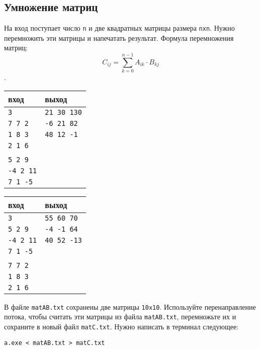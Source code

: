 \documentclass{article}
\begin{document}
\subsection{Умножение матриц}
На вход поступает число \texttt{n} и две квадратных матрицы размера \texttt{nxn}. Нужно перемножить эти матрицы и напечатать результат. Формула перемножения матриц:
$$
C_{ij} = \sum\limits_{k=0}^{n-1} A_{ik} \cdot B_{kj}
$$.
\begin{multicols}{2}
\begin{center}
\begin{tabular}{ l | l }
 вход & выход \\ \hline
 \texttt{3} &     \texttt{21 30 130}  \\ 
 \texttt{7 7 2} & \texttt{-6 21 82}  \\
 \texttt{1 8 3} & \texttt{48 12 -1}  \\ 
 \texttt{2 1 6} &  \\ 
 \texttt{} &  \\
 \texttt{5 2 9} &  \\
 \texttt{-4 2 11} &  \\ 
 \texttt{7 1 -5} &  \\ 
\end{tabular}
\end{center}

\begin{center}
\begin{tabular}{ l | l }
 вход & выход \\ \hline
 \texttt{3} &     \texttt{55 60 70}  \\ 
 \texttt{5 2 9} & \texttt{-4 -1 64}  \\
 \texttt{-4 2 11} & \texttt{40 52 -13}  \\ 
 \texttt{7 1 -5} &  \\ 
 \texttt{} &  \\
 \texttt{7 7 2} &  \\
 \texttt{1 8 3} &  \\ 
 \texttt{2 1 6} &  \\ 
\end{tabular}
\end{center}
\end{multicols}

В файле \texttt{matAB.txt} сохранены две матрицы \texttt{10x10}. Используйте перенаправление потока, чтобы считать эти матрицы из файла \texttt{matAB.txt}, перемножьте их и сохраните в новый файл \texttt{matC.txt}. Нужно написать в терминал следующее:
\begin{verbatim}
a.exe < matAB.txt > matC.txt
\end{verbatim}
\end{document}
